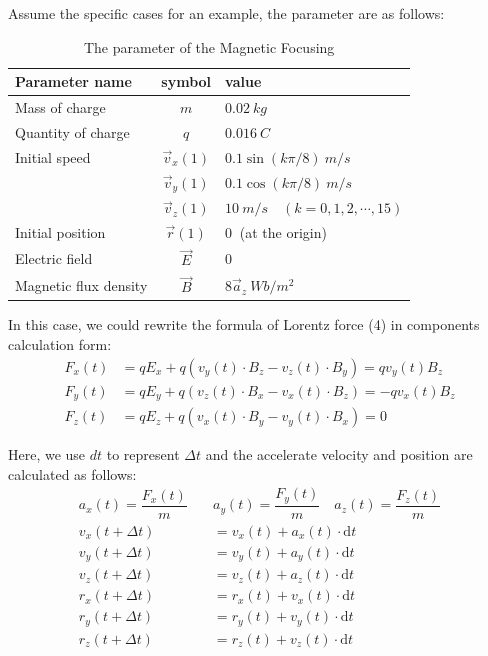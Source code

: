 \documentclass[journal,twocolumn,letterpaper]{IEEEJERM}
\begin{document}
Assume the specific cases for an example, the parameter are as follows\cite{num2}:
\begin{table} [htbp]   
   	\caption{The parameter of the Magnetic Focusing }
	 \label{Tab1} 
	 \centering
	 \setlength{\tabcolsep}{3mm}
 \begin{tabular}{lcl} 
	\toprule 
	Parameter name & symbol  & value \\ 
	\midrule 
	Mass of charge & $ m $ & $ 0.02\ kg $  \\
	Quantity of charge &  $ q $ & $ 0.016\ C $ \\
	Initial speed & $ \vec{v}_x(1) $ & $ 0.1\sin{(k\pi /8)}\ m/s $ \\
	 &$ \vec{v}_y(1) $ & $ 0.1\cos{(k\pi /8)}\ m/s $ \\
	 &$ \vec{v}_z(1) $ & $10\ m/s \quad (k=0,1,2,\cdots,15)$ \\
	Initial position & $ \vec{r}(1) $ & $ 0\  $ (at the origin) \\
	Electric field & $ \vec{E} $ & $ 0 $ \\
	Magnetic flux density & $ \vec{B} $ & $ 8\vec{a}_z \ Wb/m^2$ \\
	\bottomrule 
\end{tabular} 
\end{table}
		
In this case, we could rewrite the formula of Lorentz force (4) in components calculation form:
\begin{align*}
F_x(t)&=qE_x+q(v_y(t)\cdot B_z-v_z(t)\cdot B_y)=qv_y(t)B_z\\
F_y(t)&=qE_y+q(v_z(t)\cdot B_x-v_x(t)\cdot B_z)=-qv_x(t)B_z\\
F_z(t)&=qE_z+q(v_x(t)\cdot B_y-v_y(t)\cdot B_x)=0
\end{align*}

Here, we use $ dt $ to represent $ \Delta t $ and the accelerate velocity and position are calculated as follows:
\begin{align*}
a_x(t)=\dfrac{F_x(t)}{m} \quad &a_y(t)=\dfrac{F_y(t)}{m} \quad a_z(t)=\dfrac{F_z(t)}{m} \\
v_x(t+\Delta{t})&=v_x(t)+a_x(t)\cdot\mathrm{d}t  \\
v_y(t+\Delta{t})&=v_y(t)+a_y(t)\cdot\mathrm{d}t  \\
v_z(t+\Delta{t})&=v_z(t)+a_z(t)\cdot\mathrm{d}t  \\
r_x(t+\Delta{t})&=r_x(t)+v_x(t)\cdot\mathrm{d}t \\
r_y(t+\Delta{t})&=r_y(t)+v_y(t)\cdot\mathrm{d}t \\
r_z(t+\Delta{t})&=r_z(t)+v_z(t)\cdot\mathrm{d}t 
\end{align*}
\end{document}

